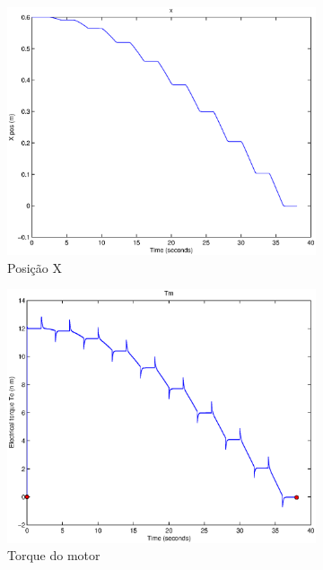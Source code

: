 \documentclass{article}
\begin{document}
\begin{figure}[H]
\begin{subfigure}{0.32\textwidth}
		\includegraphics[width=\linewidth]{matlab/x6}
		\caption{Posição X}
	\end{subfigure}
	\begin{subfigure}{0.32\textwidth}
		\includegraphics[width=\linewidth]{matlab/tm6}
		\caption{Torque do motor}
	\end{subfigure}
	\begin{subfigure}{0.32\textwidth}

\end{subfigure}
\end{figure}
\end{document}
